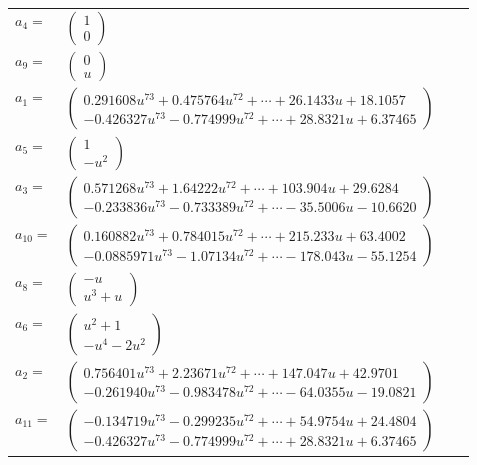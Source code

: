 \documentclass[1p]{elsarticle_modified}
\theoremstyle{definition}
\begin{document}
\begin{tabular}{m{7pt} m{180pt} m{7pt} m{180pt} }
\flushright $a_{4}=$&$\begin{pmatrix}1\\0\end{pmatrix}$ \\
\flushright $a_{9}=$&$\begin{pmatrix}0\\u\end{pmatrix}$ \\
\flushright $a_{1}=$&$\begin{pmatrix}0.291608 u^{73}+0.475764 u^{72}+\cdots+26.1433 u+18.1057\\-0.426327 u^{73}-0.774999 u^{72}+\cdots+28.8321 u+6.37465\end{pmatrix}$ \\
\flushright $a_{5}=$&$\begin{pmatrix}1\\- u^2\end{pmatrix}$ \\
\flushright $a_{3}=$&$\begin{pmatrix}0.571268 u^{73}+1.64222 u^{72}+\cdots+103.904 u+29.6284\\-0.233836 u^{73}-0.733389 u^{72}+\cdots-35.5006 u-10.6620\end{pmatrix}$ \\
\flushright $a_{10}=$&$\begin{pmatrix}0.160882 u^{73}+0.784015 u^{72}+\cdots+215.233 u+63.4002\\-0.0885971 u^{73}-1.07134 u^{72}+\cdots-178.043 u-55.1254\end{pmatrix}$ \\
\flushright $a_{8}=$&$\begin{pmatrix}- u\\u^3+u\end{pmatrix}$ \\
\flushright $a_{6}=$&$\begin{pmatrix}u^2+1\\- u^4-2 u^2\end{pmatrix}$ \\
\flushright $a_{2}=$&$\begin{pmatrix}0.756401 u^{73}+2.23671 u^{72}+\cdots+147.047 u+42.9701\\-0.261940 u^{73}-0.983478 u^{72}+\cdots-64.0355 u-19.0821\end{pmatrix}$ \\
\flushright $a_{11}=$&$\begin{pmatrix}-0.134719 u^{73}-0.299235 u^{72}+\cdots+54.9754 u+24.4804\\-0.426327 u^{73}-0.774999 u^{72}+\cdots+28.8321 u+6.37465\end{pmatrix}$ \\

\end{tabular}
\end{document}
